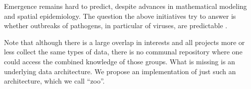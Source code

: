 Emergence remains hard to predict, despite advances in mathematical modeling and spatial epidemiology. The question the above initiatives try to answer is whether outbreaks of pathogens, in particular of viruses, are predictable \cite{Howard2012-gd, Huff2016-tm}.

Note that although there is a large overlap in interests and all projects more or less collect the same types of data, there is no communal repository where one could access the combined knowledge of those groups. What is missing is an underlying data architecture. We propose an implementation of just such an architecture, which we call ``zoo''.
